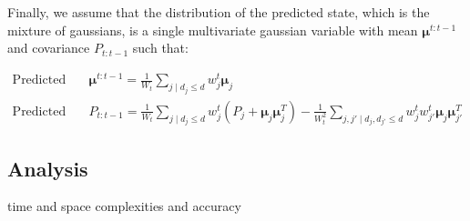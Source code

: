 Finally, we assume that the distribution of the predicted state, which is the mixture of gaussians, is a single multivariate gaussian variable with mean $\boldsymbol \mu^{t:t-1}$ and covariance $P_{t:t-1}$ such that:

\begin{equation}
\begin{array}{ll}
\text{Predicted state: } & \boldsymbol \mu^{t:t-1} = \frac{1}{W_{t}}\sum_{j\mid d_{j}\leq d}{w_{j}^{t}\boldsymbol\mu_{j}}\\
\text{Predicted covariance: } & P_{t:t-1} = \frac{1}{W_{t}}\sum_{j\mid d_{j}\leq d}{w_{j}^{t}\left(P_{j} + \boldsymbol\mu_{j} \boldsymbol\mu^{T}_{j}\right)} - \frac{1}{W^{2}_{t}}\sum_{j,j'\mid d_{j},d_{j'}\leq d}{w_{j}^{t}w_{j'}^{t}\boldsymbol\mu_{j} \boldsymbol\mu^{T}_{j'}}
\end{array}
\label{eq:mixture6}
\end{equation}


\subsection{Analysis}

time and space complexities and accuracy